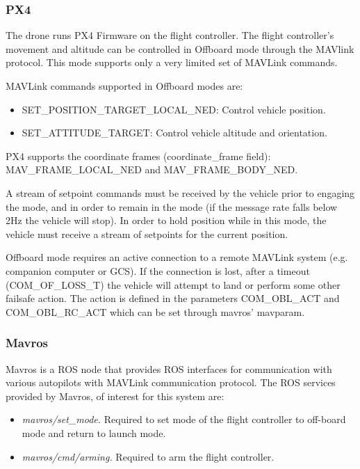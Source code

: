 \subsubsection{PX4}
The drone runs PX4 Firmware on the flight controller. The flight controller's movement and altitude can be controlled in Offboard mode through the MAVlink protocol. This mode supports only a very limited set of MAVLink commands.

MAVLink commands supported in Offboard modes are:
\begin{itemize}
	\item SET\_POSITION\_TARGET\_LOCAL\_NED: Control vehicle position.
	\item SET\_ATTITUDE\_TARGET: Control vehicle altitude and orientation.
\end{itemize}

PX4 supports the coordinate frames (coordinate\_frame field): MAV\_FRAME\_LOCAL\_NED and MAV\_FRAME\_BODY\_NED.

A stream of setpoint commands must be received by the vehicle prior to engaging the mode, and in order to remain in the mode (if the message rate falls below 2Hz the vehicle will stop). In order to hold position while in this mode, the vehicle must receive a stream of setpoints for the current position.

Offboard mode requires an active connection to a remote MAVLink system (e.g. companion computer or GCS). If the connection is lost, after a timeout (COM\_OF\_LOSS\_T) the vehicle will attempt to land or perform some other failsafe action. The action is defined in the parameters COM\_OBL\_ACT and COM\_OBL\_RC\_ACT which can be set through mavros' mavparam.

\subsubsection{Mavros}

Mavros is a ROS node that provides ROS interfaces for communication with various autopilots with MAVLink communication protocol.
The ROS services provided by Mavros,  of interest for this system are:
\begin{itemize}
	\item \textit{mavros/set\_mode.} Required to set mode of the flight controller to off-board mode and return to launch mode.
	\item \textit{mavros/cmd/arming.} Required to arm the flight controller.
\end{itemize}

